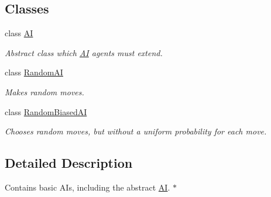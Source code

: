 \subsection*{Classes}
\begin{DoxyCompactItemize}
\item 
class \hyperlink{classai_1_1_a_i}{AI}
\begin{DoxyCompactList}\small\item\em Abstract class which \hyperlink{classai_1_1_a_i}{AI} agents must extend. \end{DoxyCompactList}\item 
class \hyperlink{classai_1_1_random_a_i}{RandomAI}
\begin{DoxyCompactList}\small\item\em Makes random moves. \end{DoxyCompactList}\item 
class \hyperlink{classai_1_1_random_biased_a_i}{RandomBiasedAI}
\begin{DoxyCompactList}\small\item\em Chooses random moves, but without a uniform probability for each move. \end{DoxyCompactList}\end{DoxyCompactItemize}


\subsection{Detailed Description}
Contains basic AIs, including the abstract \hyperlink{classai_1_1_a_i}{AI}. $\ast$ 